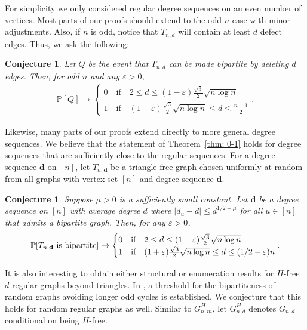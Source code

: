 \documentclass[11pt]{article}
\newcommand{\eps}{\varepsilon}
\def\P{\mathbb P}
\theoremstyle{plain}
\newtheorem{conj}[thm]{Conjecture}
\begin{document}
For simplicity we only considered regular degree sequences on an even number of vertices. Most parts of our proofs should extend to the odd $n$ case with minor adjustments. Also, if $n$ is odd, notice that $T_{n,d}$ will contain at least $d$ defect edges. Thus, we ask the following:

\begin{conj}
    Let $Q$ be the event that $T_{n,d}$ can be made bipartite by deleting $d$ edges. Then, for odd $n$ and any $\eps > 0$, 
    \begin{align*}
        \P[Q] \rightarrow \begin{cases}
            0 \quad \text{if}\quad 2 \leq d \leq (1 - \eps)\frac{\sqrt 3}{2}\sqrt{n\log n}\\
            1 \quad \text{if} \quad (1 + \eps)\frac{\sqrt 3}{2}\sqrt{n\log n} \leq d \leq \frac{n-1}{2}
        \end{cases}
        .
    \end{align*}
\end{conj}




Likewise, many parts of our proofs extend directly to more general degree sequences. We believe that the statement of Theorem~\ref{thm: 0-1} holds for degree sequences that are sufficiently close to the regular sequences. For a degree sequence $\mathbf d$ on $[n]$, let $T_{n,\mathbf d}$ be a triangle-free graph chosen uniformly at random from all graphs with vertex set $[n]$ and degree sequence $\mathbf d$.


\begin{conj} Suppose $\mu > 0$ is a sufficiently small constant. Let $\mathbf d$ be a degree sequence on $[n]$ with average degree $d$ where $|d_u - d| \leq  d^{1/2+\mu}$ for all $u \in [n]$ that admits a bipartite graph. Then, for any $\eps > 0$,
    \begin{align*}
        \P[T_{n,{\bf d}} \text{ is bipartite}] \rightarrow \begin{cases}
            0 &\text{if}\quad 2 \leq d \leq (1 - \eps)\frac{\sqrt 3}{2}\sqrt{n\log n}\\
            1 &\text{if} \quad(1 + \eps)\frac{\sqrt 3}{2}\sqrt{n\log n} \leq d \le (1/2-\eps)n
        \end{cases}
        .
    \end{align*}

\end{conj}

It is also interesting to obtain either structural or enumeration results for $H$-free $d$-regular graphs beyond triangles. In \cite{osthus2003densities}, a threshold for the bipartiteness of random graphs avoiding longer odd cycles is established. We conjecture that this holds for random regular graphs as well. Similar to $G^{H^-}_{n,m}$, let $G^{H^-}_{n,d}$ denotes $G_{n,d}$ conditional on being $H$-free.
\end{document}
